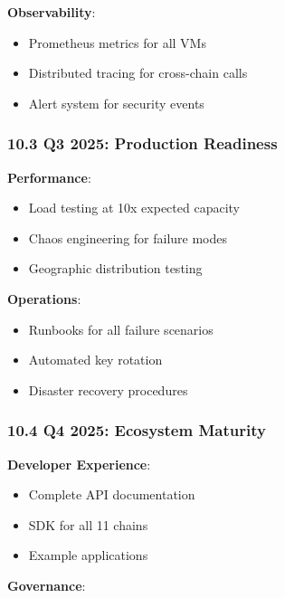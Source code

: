 \documentclass[
]{article}
\providecommand{\tightlist}{%
  \setlength{\itemsep}{0pt}\setlength{\parskip}{0pt}}
\begin{document}
\textbf{Observability}:

\begin{itemize}
\tightlist
\item[$\square$]
  Prometheus metrics for all VMs
\item[$\square$]
  Distributed tracing for cross-chain calls
\item[$\square$]
  Alert system for security events
\end{itemize}

\subsubsection{10.3 Q3 2025: Production
Readiness}\label{103-q3-2025-production-readiness}

\textbf{Performance}:

\begin{itemize}
\tightlist
\item[$\square$]
  Load testing at 10x expected capacity
\item[$\square$]
  Chaos engineering for failure modes
\item[$\square$]
  Geographic distribution testing
\end{itemize}

\textbf{Operations}:

\begin{itemize}
\tightlist
\item[$\square$]
  Runbooks for all failure scenarios
\item[$\square$]
  Automated key rotation
\item[$\square$]
  Disaster recovery procedures
\end{itemize}

\subsubsection{10.4 Q4 2025: Ecosystem
Maturity}\label{104-q4-2025-ecosystem-maturity}

\textbf{Developer Experience}:

\begin{itemize}
\tightlist
\item[$\square$]
  Complete API documentation
\item[$\square$]
  SDK for all 11 chains
\item[$\square$]
  Example applications
\end{itemize}

\textbf{Governance}:
\end{document}
